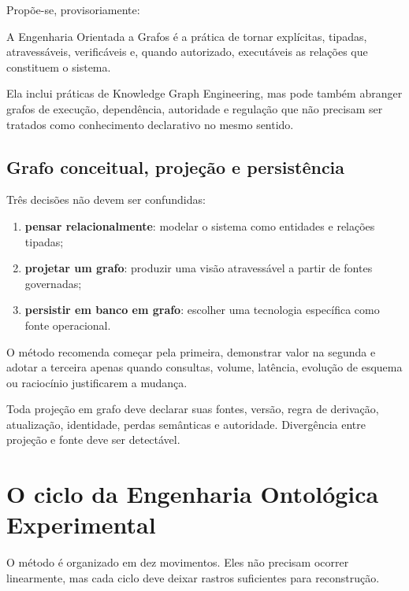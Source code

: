 \documentclass[11pt,a4paper,oneside]{article}
\begin{document}
Propõe-se, provisoriamente:

\begin{hipotese}
A Engenharia Orientada a Grafos é a prática de tornar explícitas, tipadas, atravessáveis, verificáveis e, quando autorizado, executáveis as relações que constituem o sistema.
\end{hipotese}

Ela inclui práticas de Knowledge Graph Engineering, mas pode também abranger grafos de execução, dependência, autoridade e regulação que não precisam ser tratados como conhecimento declarativo no mesmo sentido.

\subsection{Grafo conceitual, projeção e persistência}

Três decisões não devem ser confundidas:

\begin{enumerate}
  \item \textbf{pensar relacionalmente}: modelar o sistema como entidades e relações tipadas;
  \item \textbf{projetar um grafo}: produzir uma visão atravessável a partir de fontes governadas;
  \item \textbf{persistir em banco em grafo}: escolher uma tecnologia específica como fonte operacional.
\end{enumerate}

O método recomenda começar pela primeira, demonstrar valor na segunda e adotar a terceira apenas quando consultas, volume, latência, evolução de esquema ou raciocínio justificarem a mudança.

\begin{principio}
Toda projeção em grafo deve declarar suas fontes, versão, regra de derivação, atualização, identidade, perdas semânticas e autoridade. Divergência entre projeção e fonte deve ser detectável.
\end{principio}

\section{O ciclo da Engenharia Ontológica Experimental}

O método é organizado em dez movimentos. Eles não precisam ocorrer linearmente, mas cada ciclo deve deixar rastros suficientes para reconstrução.
\end{document}
